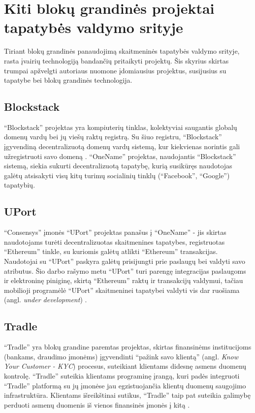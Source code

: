 \section{Kiti blokų grandinės projektai tapatybės valdymo srityje}

Tiriant blokų grandinės panaudojimą skaitmeninės tapatybės valdymo srityje, rasta įvairių
technologiją bandančių pritaikyti projektų. Šis skyrius skirtas trumpai apžvelgti autoriaus nuomone
įdomiausius projektus, susijusius su tapatybe bei blokų grandinės technologija.

\subsection{Blockstack}

\enquote{Blockstack} projektas yra kompiuterių tinklas, kolektyviai saugantis globalų
domenų vardų bei jų viešų raktų registrą. Su šiuo registru, \enquote{Blockstack} įgyvendiną
decentralizuotą domenų vardų sistemą, kur kiekvienas norintis gali užregistruoti savo domeną \cite{BlockstackWhitepaper}.
\enquote{OneName} projektas, naudojantis \enquote{Blockstack} sistemą, siekia sukurti decentralizuotą tapatybę,
kurią susikūręs naudotojas galėtų atsisakyti visų kitų turimų socialinių tinklų (\enquote{Facebook},
\enquote{Google}) tapatybių.

\subsection{UPort}

\enquote{Consensys} įmonės \enquote{UPort} projektas panašus į \enquote{OneName} - jis skirtas naudotojams turėti decentralizuotas
skaitmenines tapatybes, registruotas \enquote{Ethereum} tinkle, su kuriomis galėtų atlikti \enquote{Ethereum} transakcijas.
Naudotojai su \enquote{UPort} paskyra
galėtų prisijungti prie paslaugų bei valdyti savo atributus. Šio darbo rašymo metu \enquote{UPort} turi
parengę integracijas paslaugoms ir elektroninę piniginę, skirtą \enquote{Ethereum} raktų
ir transakcijų valdymui, tačiau mobilioji programėlė \enquote{UPort} skaitmeninei tapatybei valdyti vis dar ruošiama (angl.
\textit{under development}) \cite{UPort}.

\subsection{Tradle}

\enquote{Tradle} yra blokų grandine paremtas projektas, skirtas finansinėms institucijoms (bankams,
draudimo įmonėms) įgyvendinti \enquote{pažink savo klientą} (angl. \textit{Know Your Customer - KYC}) procesus,
suteikiant klientams didesnę asmens duomenų kontrolę. \enquote{Tradle} suteikia
klientams programinę įrangą, kuri padės integruoti \enquote{Tradle} platformą su jų įmonėse jau egzistuojančia klientų duomenų saugojimo
infrastruktūra. Klientams išreikštinai sutikus, \enquote{Tradle} taip pat suteikia galimybę perduoti asmenų duomenis iš vienos
finansinės įmonės į kitą \cite{Baars2016}.
